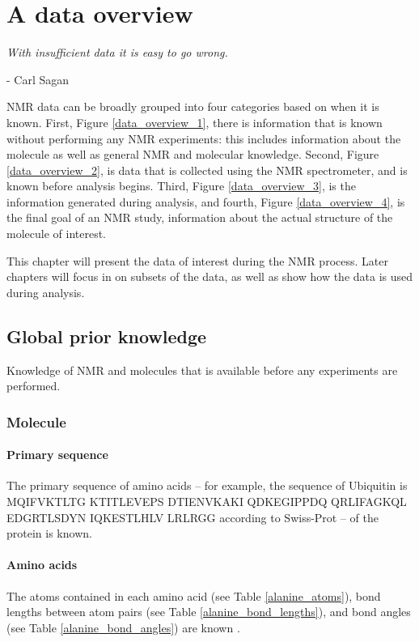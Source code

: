 \chapter{A data overview}
\label{ch_data_overview}

\begin{center}
  \textit{With insufficient data it is easy to go wrong.}

 - Carl Sagan
\end{center}

NMR data can be broadly grouped into four categories based on when it
is known.  First, Figure \ref{data_overview_1}, 
there is information that is known without performing
any NMR experiments: this includes information about the molecule as well
as general NMR and molecular knowledge.  Second,
Figure \ref{data_overview_2}, is data that is 
collected using the NMR spectrometer, and is known before analysis begins.  
Third, Figure \ref{data_overview_3}, is the information generated during 
analysis, and fourth, Figure \ref{data_overview_4}, is the final goal of 
an NMR study, information about the actual structure of the molecule of 
interest.

This chapter will present the data of interest during the NMR process.
Later chapters will focus in on subsets of the data, as well as show how
the data is used during analysis.


\section{Global prior knowledge}
Knowledge of NMR and molecules that is available before any experiments are
performed.

\subsection*{Molecule}

\subsubsection{Primary sequence}
The primary sequence of amino acids -- for example, the sequence of Ubiquitin
is MQIFVKTLTG KTITLEVEPS DTIENVKAKI QDKEGIPPDQ QRLIFAGKQL EDGRTLSDYN IQKESTLHLV LRLRGG
according to Swiss-Prot -- of the protein is known.  

\subsubsection{Amino acids}
The atoms contained in each amino acid (see Table \ref{alanine_atoms}), 
bond lengths between atom pairs (see Table \ref{alanine_bond_lengths}), 
and bond angles (see Table \ref{alanine_bond_angles}) are known 
\cite{alanine_sreepad}.

